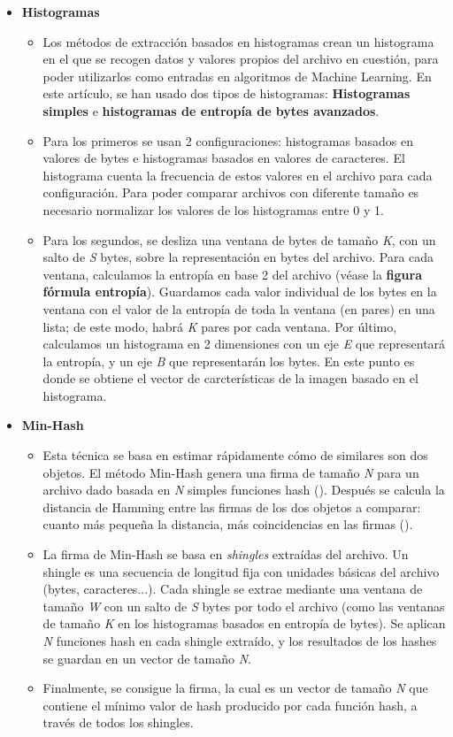 \begin{itemize}
\item \textbf{Histogramas}
\begin{itemize}
\item Los métodos de extracción basados en histogramas crean un histograma en el que se recogen datos y valores propios del archivo en cuestión, para poder utilizarlos como entradas en algoritmos de Machine Learning. En este artículo, se han usado dos tipos de histogramas: \textbf{Histogramas simples} e \textbf{histogramas de entropía de bytes avanzados}.
\item Para los primeros se usan 2 configuraciones: histogramas basados en valores de bytes e histogramas basados en valores de caracteres. El histograma cuenta la frecuencia de estos valores en el archivo para cada configuración. Para poder comparar archivos con diferente tamaño es necesario normalizar los valores de los histogramas entre 0 y 1.
\item Para los segundos, se desliza una ventana de bytes de tamaño \textit{K}, con un salto de \textit{S} bytes, sobre la representación en bytes del archivo. Para cada ventana, calculamos la entropía en base 2 del archivo (véase la \textbf{figura fórmula entropía}). Guardamos cada valor individual de los bytes en la ventana con el valor de la entropía de toda la ventana (en pares) en una lista; de este modo, habrá \textit{K} pares por cada ventana. Por último, calculamos un histograma en 2 dimensiones con un eje \textit{E} que representará la entropía, y un eje \textit{B} que representarán los bytes. En este punto es donde se obtiene el vector de carcterísticas de la imagen basado en el histograma.

\end{itemize}
\item \textbf{Min-Hash}
\begin{itemize}
\item Esta técnica se basa en estimar rápidamente cómo de similares son dos objetos. El método Min-Hash genera una firma de tamaño \textit{N} para un archivo dado basada en \textit{N} simples funciones hash (\cite{min-hash}). Después se calcula la distancia de Hamming entre las firmas de los dos objetos a comparar: cuanto más pequeña la distancia, más coincidencias en las firmas (\cite{hamming}). %
\item La firma de Min-Hash se basa en \textit{shingles} extraídas del archivo. Un shingle es una secuencia de longitud fija con unidades básicas del archivo (bytes, caracteres...). Cada shingle se extrae mediante una ventana de tamaño \textit{W} con un salto de \textit{S} bytes por todo el archivo (como las ventanas de tamaño \textit{K} en los histogramas basados en entropía de bytes). Se aplican \textit{N} funciones hash en cada shingle extraído, y los resultados de los hashes se guardan en un vector de tamaño \textit{N}.
\item Finalmente, se consigue la firma, la cual es un vector de tamaño \textit{N} que contiene el mínimo valor de hash producido por cada función hash, a través de todos los shingles.
\end{itemize}
\end{itemize}

